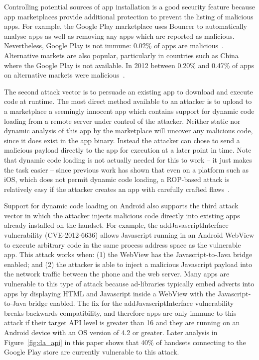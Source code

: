 \documentclass{llncs}
\let\OldTodo\todo
\renewcommand{\todo}{\OldTodo}%
\begin{document}
Controlling potential sources of app installation is a good security feature because app marketplaces provide additional protection to prevent the listing of malicious apps.
For example, the Google Play marketplace uses Bouncer to automatically analyse apps as well as removing any apps which are reported as malicious.
Nevertheless, Google Play is not immune: 0.02\% of apps are malicious~\cite{Zhou2012a}.
Alternative markets are also popular, particularly in countries such as China where the Google Play is not available. 
In 2012 between 0.20\% and 0.47\% of apps on alternative markets were malicious~\cite{Zhou2012a}.

The second attack vector is to persuade an existing app to download and execute code at runtime.
The most direct method available to an attacker is to upload to a marketplace a seemingly innocent app which contains support for dynamic code loading from a remote server under control of the attacker.
Neither static nor dynamic analysis of this app by the marketplace will uncover any malicious code, since it does exist in the app binary.
Instead the attacker can chose to send a malicious payload directly to the app for execution at a later point in time.
Note that dynamic code loading is not actually needed for this to work -- it just makes the task easier -- since previous work has shown that even on a platform such as iOS, which does not permit dynamic code loading, a ROP-based attack is relatively easy if the attacker creates an app with carefully crafted flaws~\cite{Wang2013a}.

Support for dynamic code loading on Android also supports the third attack vector in which the attacker injects malicious code directly into existing apps already installed on the handset. 
For example, the addJavascriptInterface vulnerability (CVE-2012-6636) allows Javascript running in an Android WebView to execute arbitrary code in the same process address space as the vulnerable app.
This attack works when: (1) the WebView has the Javascript-to-Java bridge enabled; and (2) the attacker is able to inject a malicious Javascript payload into the network traffic between the phone and the web server. 
Many apps are vulnerable to this type of attack because ad-libraries typically embed adverts into apps by displaying HTML and Javascript inside a WebView with the Javascript-to-Java bridge enabled. 
The fix for the addJavascriptInterface vulnerability breaks backwards compatibility, and therefore apps are only immune to this attack if their target API level is greater than 16 and they are running on an Android device with an OS version of 4.2 or greater.
Later analysis in Figure~\ref{fig:da_api} in this paper shows that 40\% of handsets connecting to the Google Play store are currently vulnerable to this attack.
\end{document}
